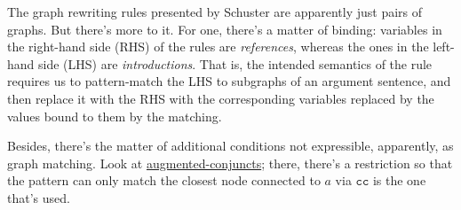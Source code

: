 \documentclass{article}
\begin{document}
	The graph rewriting rules presented by Schuster are apparently just pairs of graphs. But there's more to it. For one, there's a matter of binding: variables in the right-hand side (RHS) of the rules are \emph{references}, whereas the ones in the left-hand side (LHS) are \emph{introductions}. That is, the intended semantics of the rule requires us to pattern-match the LHS to subgraphs of an argument sentence, and then replace it with the RHS with the corresponding variables replaced by the values bound to them by the matching.
	
	Besides, there's the matter of additional conditions not expressible, apparently, as graph matching. Look at \hyperref[augmented-conjuncts]{\textsf{augmented-conjuncts}}; there, there's a restriction so that the pattern can only match the closest node connected to $a$ via $\texttt{cc}$ is the one that's used.


%
%
%
\end{document}
